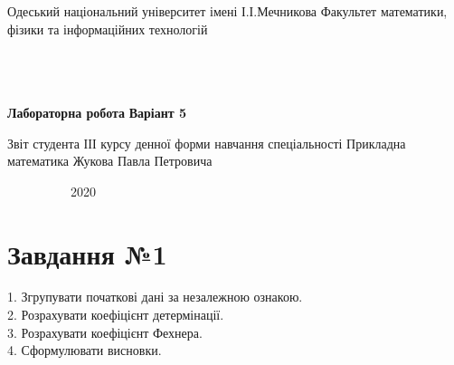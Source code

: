 \documentclass[12pt]{article}
\begin{document}
\begin{center}
\large{Одеський національний університет імені І.І.Мечникова
    \newline
Факультет математики, фізики та інформаційних технологій
    \newline
}
\bigbreak
\bigbreak
\bigbreak
\bigbreak
\bigbreak
\bigbreak
\bigbreak
\bigbreak
\\
\\
\\
\\
\bigbreak
\LARGE{ \textbf{Лабораторна робота}
\bigbreak
\textbf{Варіант 5}
\bigbreak

\bigbreak
}
\end{center}
\bigbreak
\bigbreak
\bigbreak
\bigbreak
\begin{flushright}
\large{Звіт студента ІІІ курсу
\bigbreak
денної форми навчання
\bigbreak
спеціальності
 Прикладна математика
\bigbreak
Жукова Павла Петровича
\bigbreak
\begin{center}

  \bigbreak
  \
  \bigbreak
  \
  \bigbreak
  \
  \bigbreak
  \
  \LARGE{ {}
  \
\bigbreak
\
\bigbreak
}
                  2020

\end{center}
}
\end{flushright}

\newpage

\section{Завдання №1}
1. Згрупувати початкові дані за незалежною ознакою. \\
2. Розрахувати коефіцієнт детермінації. \\
3. Розрахувати коефіцієнт Фехнера.\\
4. Сформулювати висновки.
\end{document}
